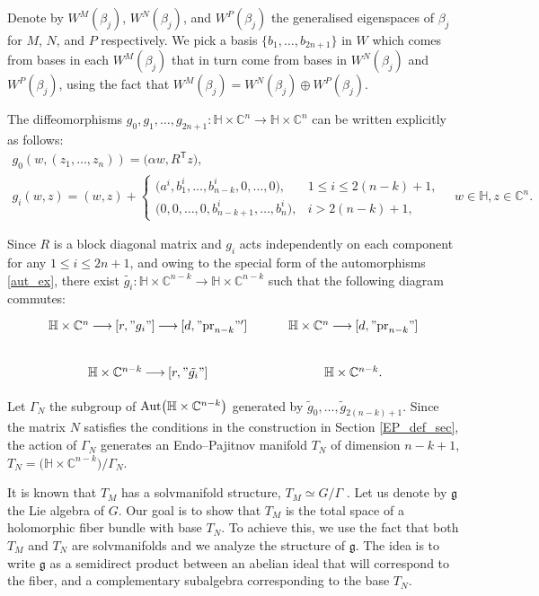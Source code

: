 \documentclass[10pt,a4paper]{amsart}
\newcommand{\6}{\partial}
\newcommand{\arrow}{{\:\longrightarrow\:}}
\numberwithin{equation}{section}
\begin{document}
Denote by $W^M(\beta_j)$, $W^N(\beta_j)$, and $W^P(\beta_j)$ the generalised eigenspaces of $\beta_j$ for $M$, $N$, and $P$ respectively. We pick a basis $\{ b_1, \dots, b_{2n+1} \}$ in $W$ which comes from bases in each $W^M(\beta_j)$ that in turn come from bases in $W^N(\beta_j)$ and $W^P(\beta_j)$, using the fact that $W^M(\beta_j) = W^N(\beta_j) \oplus W^P(\beta_j)$.

The diffeomorphisms $g_0, g_1, \dots, g_{2n+1}\colon \mathbb{H} \times \mathbb{C}^n \longrightarrow \mathbb{H} \times \mathbb{C}^n$ can be written explicitly as follows:
\begin{gather}
		g_0(w, (z_1, \dots, z_n)) = \bigl(\alpha w, R^{\mathsf{T}}z\bigr),\label{aut_ex}\\
		g_i(w, z) = (w, z) +
\begin{cases}
\big(a^i, b_1^i, \dots, b_{n-k}^i, 0, \dots, 0\big), & 1 \leq i \leq 2(n-k)+1, \\
\big(0, 0, \dots, 0, b_{n-k+1}^i, \dots, b_n^i\big), & i > 2(n-k)+1,
\end{cases}
\quad w \in \mathbb{H}, z \in \mathbb{C}^n.\nonumber
\end{gather}

Since $R$ is a block diagonal matrix and $g_i$ acts independently on each component for any $ 1 \leq i \leq 2n+1$, and owing to the special form of the automorphisms \eqref{aut_ex}, there exist ${\tilde{g_i}\colon \mathbb{H} \times \mathbb{C}^{n-k} \longrightarrow \mathbb{H} \times \mathbb{C}^{n-k}}$ such that the following diagram commutes:
\[
\begin{tikzcd}
	\mathbb{H} \times \mathbb{C}^{n} \arrow[r, "g_i"] \arrow[d, "{\rm pr}_{n-k}"'] & \mathbb{H} \times \mathbb{C}^{n} \arrow[d, "{\rm pr}_{n-k}"] \\
	\mathbb{H} \times \mathbb{C}^{n-k} \arrow[r, "\tilde{g_i}"] & \mathbb{H} \times \mathbb{C}^{n-k}.
\end{tikzcd}
\]

Let $\Gamma_N$ the subgroup of ${\rm Aut}\bigl(\mathbb{H} \times \mathbb{C}^{n-k}\bigr)$ generated by $\tilde g_0, \dots, \tilde g_{2(n-k)+1}$.
Since the matrix $N$ satisfies the conditions in the construction in Section \ref{EP_def_sec}, the action of $\Gamma_N$ generates an Endo--Pajitnov manifold $T_N$ of dimension $n-k+1$, $T_N=\big(\mathbb{H} \times \mathbb{C}^{n-k}\big)/ {\Gamma_N}$.

It is known that $T_M$ has a solvmanifold structure, $T_M \simeq G/{\Gamma}$ \cite[Theorem~3.1]{cos}. Let us denote by $\mathfrak{g}$ the Lie algebra of $G$.
Our goal is to show that $T_M$ is the total space of a holomorphic fiber bundle with base $T_N$. To achieve this, we use the fact that both $T_M$ and $T_N$ are solvmanifolds and we analyze the structure of $\mathfrak{g}$. The idea is to write $\mathfrak{g}$ as a semidirect product between an abelian ideal that will correspond to the fiber, and a complementary subalgebra corresponding to the base $T_N$.
\end{document}
